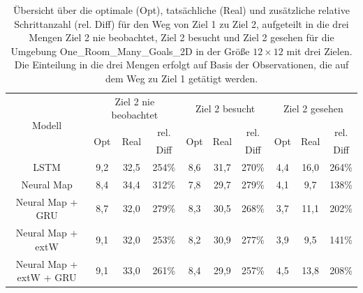 \begin{table}
  \begin{tabular}{|c|c|c|c|c|c|c|c|c|c|}
    \hline
    \multirow{3}{*}{Modell} & \multicolumn{3}{|c|}{Ziel 2 nie beobachtet} & \multicolumn{3}{|c|}{Ziel 2 besucht} & \multicolumn{3}{|c|}{Ziel 2 gesehen} \\ \cline{2-10}
    & \multirow{2}{*}{Opt} & \multirow{2}{*}{Real} & rel. & \multirow{2}{*}{Opt} & \multirow{2}{*}{Real} & rel. & \multirow{2}{*}{Opt} & \multirow{2}{*}{Real} & rel. \\
    & & & Diff & & & Diff & & & Diff \\ \hline
    LSTM & 9,2 & 32,5 & 254\% & 8,6 & 31,7 & 270\% & 4,4 & 16,0 & 264\% \\ \hline
    Neural Map & 8,4 & 34,4 & 312\% & 7,8 & 29,7 & 279\% & 4,1 & 9,7 & 138\% \\ \hline
    Neural Map + GRU & 8,7 & 32,0 & 279\% & 8,3 & 30,5 & 268\% & 3,7 & 11,1 & 202\% \\ \hline
    Neural Map + extW & 9,1 & 32,0 & 253\% & 8,2 & 30,9 & 277\% & 3,9 & 9,5 & 141\% \\ \hline
    Neural Map + extW + GRU & 9,1 & 33,0 & 261\% & 8,4 & 29,9 & 257\% & 4,5 & 13,8 & 208\% \\ \hline
  \end{tabular}
  \caption{Übersicht über die optimale (Opt), tatsächliche (Real) und zusätzliche relative Schrittanzahl (rel. Diff) für den Weg von Ziel 1 zu Ziel 2, aufgeteilt in die drei Mengen \glqq Ziel 2 nie beobachtet\grqq{}, \glqq Ziel 2 besucht\grqq{} und \glqq Ziel 2 gesehen\grqq{} für die Umgebung \glqq One\_Room\_Many\_Goals\_2D\grqq{} in der Größe $12 \times 12$ mit drei Zielen. Die Einteilung in die drei Mengen erfolgt auf Basis der Observationen, die auf dem Weg zu Ziel 1 getätigt werden.}
  \label{results12x12_1_to_2_per_M}
\end{table}

